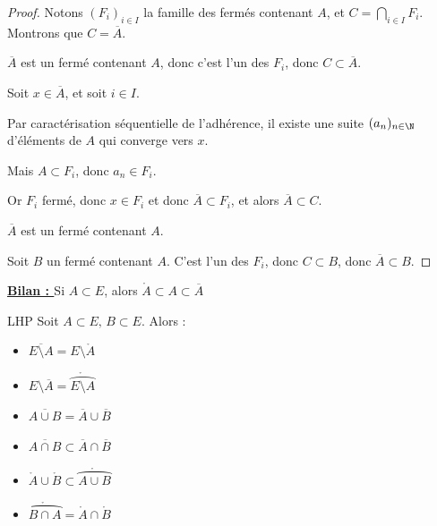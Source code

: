 \begin{proof}
    Notons $(F_i)_{i \in I}$ la famille des fermés contenant $A$, et
    $ \displaystyle C = \bigcap_{i \in I} F_i$. Montrons que $C = \overline{A}$.

    $\overline{A}$ est un fermé contenant $A$, donc c'est l'un des $F_i$, donc $ C \subset \overline{A}$.

    Soit $x \in \overline{A}$, et soit $i \in I$. 

    Par caractérisation séquentielle de l'adhérence, il existe une suite $(a_n)_{n \in \N}$ d'éléments de $A$ qui converge vers $x$.

    Mais $A \subset F_i$, donc $a_n \in F_i$.

    Or $F_i$ fermé, donc $x \in F_i$ et donc $\overline A \subset F_i$, 
    et alors $\overline A \subset C$.

    $\overline A$ est un fermé contenant $A$. 

    Soit $B$ un fermé contenant $A$. C'est l'un des $F_i$, donc $C \subset B$, 
    donc $\overline A \subset B$.
\end{proof}


\textbf{\uline{Bilan : }}
Si $A \subset E$, alors $\mathring A \subset A \subset \overline A$


\begin{proposition}{LHP}{}
    Soit $A \subset E, \, B \subset E$. Alors :
    \begin{itemize}
        \item $\overline{E \setminus A} = E \setminus \mathring{A}$
        \item $E \setminus \overline A = \mathring{\overparen{E \setminus A}}$
        \item $\overline{A \cup B} = \overline{A} \cup \overline{B}$
        \item $\overline{A \cap B} \subset \overline{A} \cap \overline{B}$
        \item $\mathring A \cup \mathring B \subset \mathring{\overparen{A \cup B}}$ 
        \item $\mathring{\overparen{B \cap A}} = \mathring A \cap \mathring B$
    \end{itemize} 
\end{proposition}


